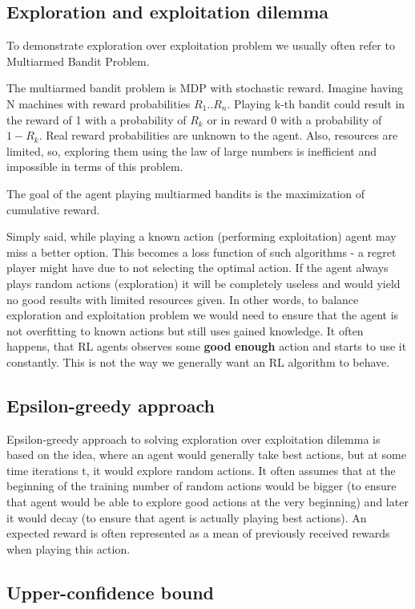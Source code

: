 \subsection{Exploration and exploitation dilemma}
To demonstrate exploration over exploitation problem we usually often refer to Multiarmed Bandit Problem.

The multiarmed bandit problem is MDP with stochastic reward. Imagine having N machines with reward probabilities $R_1 .. R_n$. Playing k-th bandit could result in the reward of 1 with a probability of $R_k$ or in reward 0 with a probability of $1 - R_k$. Real reward probabilities are unknown to the agent. Also, resources are limited, so, exploring them using the law of large numbers is inefficient and impossible in terms of this problem.

The goal of the agent playing multiarmed bandits is the maximization of cumulative reward.

Simply said, while playing a known action (performing exploitation) agent may miss a better option. This becomes a loss function of such algorithms - a regret player might have due to not selecting the optimal action. If the agent always plays random actions (exploration) it will be completely useless and would yield no good results with limited resources given.
In other words, to balance exploration and exploitation problem we would need to ensure that the agent is not overfitting to known actions but still uses gained knowledge. It often happens, that RL agents observes some \textbf{good} \textbf{enough} action and starts to use it constantly. This is not the way we generally want an RL algorithm to behave.
\subsection{Epsilon-greedy approach}
Epsilon-greedy approach to solving exploration over exploitation dilemma is based on the idea, where an agent would generally take best actions, but at some time iterations t, it would explore random actions. It often assumes that at the beginning of the training number of random actions would be bigger (to ensure that agent would be able to explore good actions at the very beginning) and later it would decay (to ensure that agent is actually playing best actions). An expected reward is often represented as a mean of previously received rewards when playing this action. 

\subsection{Upper-confidence bound}

